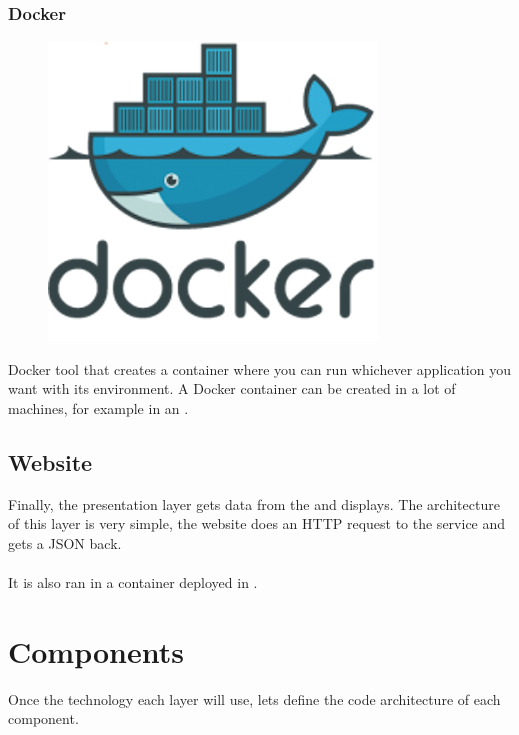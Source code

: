 \subsubsection*{Docker} \label{docker}

\begin{figure}[H]
\includegraphics[scale=0.1]{resources/docker-logo.png}
\end{figure}

Docker\cite{docker} tool that creates a container where you can run whichever application you want with its environment. A Docker container can be created in a lot of machines, for example in an .


\subsection{Website}

Finally, the presentation layer gets data from the  and displays. The architecture of this layer is very simple, the website does an HTTP request to the service and gets a JSON back.
\\\\
It is also ran in a  container deployed in .


\section{Components}

Once the technology each layer will use, lets define the code architecture of each component.


